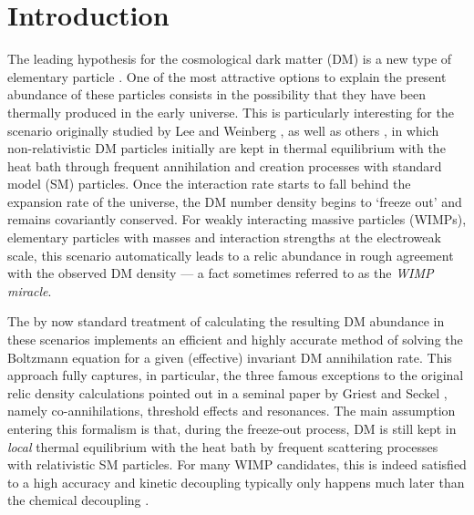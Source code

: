 \documentclass[twocolumn,showpacs,amsmath,amssymb,superscriptaddress,nofootinbib]{revtex4-1}
\begin{document}

\maketitle

\section{Introduction}

The leading hypothesis for the cosmological dark matter (DM) \cite{Hinshaw:2012aka,Ade:2015xua} 
is a new type of elementary particle \cite{Bertone:2004pz}. One of the most attractive 
options to explain the present abundance of these particles consists in the 
possibility that they have been thermally produced in the early universe. This is
particularly interesting for the scenario originally studied by Lee and 
Weinberg \cite{Lee:1977ua}, as well as 
others \cite{Hut:1977zn,Sato:1977ye,Dicus:1977nn,Wolfram:1978gp}, 
in which non-relativistic DM
particles initially are kept in thermal equilibrium with the heat bath through frequent 
annihilation and creation processes with standard model (SM) particles. Once the 
interaction rate starts to fall behind the expansion rate of the universe, 
the DM number density begins to `freeze out' and remains covariantly conserved. For 
weakly interacting massive particles (WIMPs), elementary particles with masses 
and interaction strengths at the electroweak
scale, this scenario automatically leads to a relic abundance in rough
agreement with the observed DM density  --- a fact sometimes
referred to as the {\it WIMP miracle}.

The by now standard treatment \cite{Gondolo:1990dk,Edsjo:1997bg} of calculating the 
resulting DM abundance in these scenarios implements an efficient and highly accurate 
method of solving the Boltzmann equation %
for a given (effective) invariant DM annihilation rate.
This approach fully captures, in particular, the three famous exceptions to the original relic density 
calculations pointed out in a seminal paper by Griest and Seckel \cite{Griest:1990kh},
namely co-annihilations, threshold effects and resonances. The main assumption 
entering this formalism is that, during the freeze-out process, DM is still kept in {\it local} 
thermal equilibrium with the heat bath by frequent scattering processes with relativistic 
SM particles. For many WIMP candidates, this is indeed satisfied to a high accuracy
and kinetic decoupling typically only happens much later than the chemical decoupling
\cite{Bringmann:2009vf}.
\end{document}

